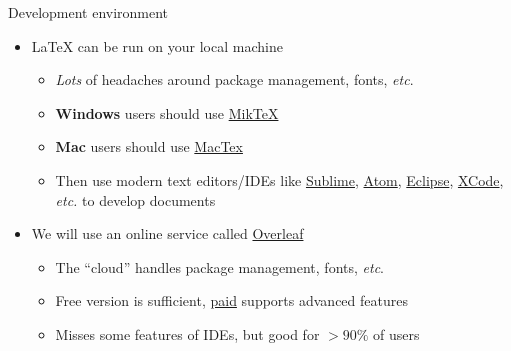 \documentclass{cubeamer}
\begin{document}
\begin{frame}{Development environment}
    \begin{itemize}
        \item \LaTeX{} can be run on your local machine
        \begin{itemize}
            \item \textit{Lots} of headaches around package management, fonts, \textit{etc}.
            \item \textbf{Windows} users should use \href{https://miktex.org/}{MikTeX}
            \item \textbf{Mac} users should use \href{https://www.tug.org/mactex/}{MacTex}
            \item Then use modern text editors/IDEs like \href{https://www.sublimetext.com/}{Sublime}, \href{https://atom.io/}{Atom}, \href{https://www.eclipse.org/ide/}{Eclipse}, \href{https://developer.apple.com/xcode/}{XCode}, \textit{etc.} to develop documents
        \end{itemize}
        \item We will use an online service called \href{https://www.overleaf.com}{Overleaf}
        \begin{itemize}
            \item The ``cloud'' handles package management, fonts, \textit{etc}.
            \item Free version is sufficient, \href{https://www.overleaf.com/user/subscription/plans}{paid} supports advanced features
            \item Misses some features of IDEs, but good for $>90\%$ of users
        \end{itemize}
    \end{itemize}
\end{frame}
\end{document}
